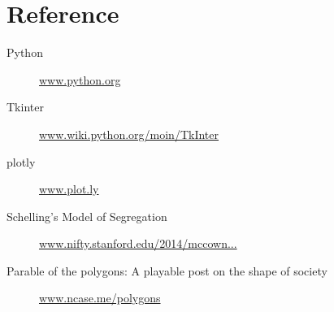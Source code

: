 \documentclass[a4paper,titlepage,11pt]{article}
\begin{document}
\newpage

\section{Reference}

\begin{description}
  \item[Python] \href{https://www.python.org}{www.python.org}
  \item[Tkinter] \href{https://wiki.python.org/moin/TkInter}{www.wiki.python.org/moin/TkInter}
  \item[plotly] \href{https://plot.ly/}{www.plot.ly}
  \item[Schelling's Model of Segregation] \href{http://nifty.stanford.edu/2014/mccown-schelling-model-segregation/}{www.nifty.stanford.edu/2014/mccown...}
  \item[Parable of the polygons: A playable post on the shape of society] \href{http://ncase.me/polygons/}{www.ncase.me/polygons}
\end{description}

\newpage
\end{document}
